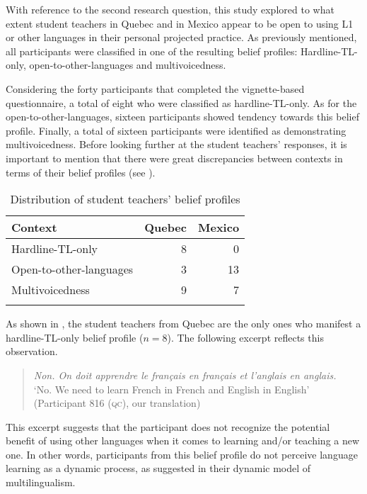 \documentclass[output=paper]{../langscibook}
\begin{document}
With reference to the second research question, this study explored to what extent student teachers in Quebec and in Mexico appear to be open to using L1 or other languages in their personal projected practice. As previously mentioned, all participants were classified in one of the resulting belief profiles: Hardline-TL-only, open-to-other-languages and multivoicedness. 

Considering the forty participants that completed the vignette-based questionnaire, a total of eight who were classified as hardline-TL-only. As for the open-to-other-languages, sixteen participants showed tendency towards this belief profile. Finally, a total of sixteen participants were identified as demonstrating multivoicedness. Before looking further at the student teachers’ responses, it is important to mention that there were great discrepancies between contexts in terms of their belief profiles (see ).

\begin{table}
\begin{tabular}{lrr}
\lsptoprule
Context & Quebec & Mexico\\\midrule
Hardline-TL-only & 8 & 0\\
Open-to-other-languages & 3 & 13\\
Multivoicedness & 9 & 7\\
\lspbottomrule
\end{tabular}
\caption{\label{tab:paquet:2}Distribution of student teachers’ belief profiles}
\end{table}

As shown in , the student teachers from Quebec are the only ones who manifest a hardline-TL-only belief profile ($n=8$). The following excerpt reflects this observation.

\begin{quote}
\emph{Non. On doit apprendre le français en français et l'anglais en anglais.}\smallskip\\
`No. We need to learn French in French and English in English' (Participant 816 (\textsc{qc}), our translation)
\end{quote}

This excerpt suggests that the participant does not recognize the potential benefit of using other languages when it comes to learning and/or teaching a new one. In other words, participants from this belief profile do not perceive language learning as a dynamic process, as \citet{HerdinaJessner2002} suggested in their dynamic model of multilingualism. 
\end{document}

